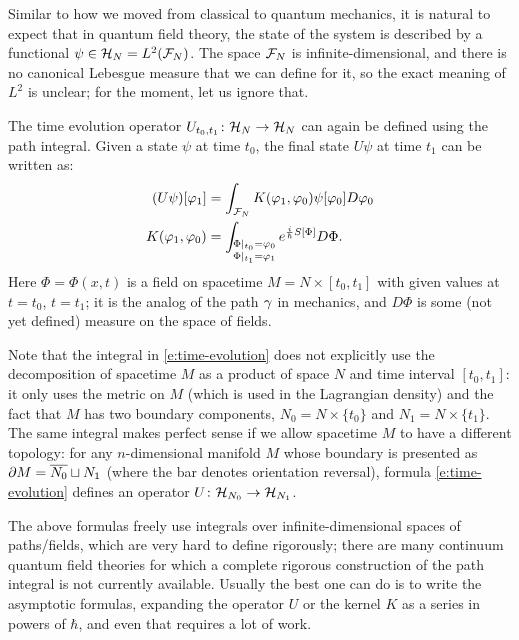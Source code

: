
Similar to how we moved from classical to quantum mechanics, it is natural to
expect that in quantum field theory, the state of the system is described by a
functional $\psi \in \mathcal{H}_N = L^2(\mathcal{F}_N)$. The space $\mathcal{F}_N$ is
infinite-dimensional, and there is no canonical Lebesgue measure that we can
define for it, so the exact meaning of $L^2$ is unclear; for the
moment, let us ignore that.


The time evolution operator $U_{t_0,t_1}\colon \mathcal{H}_N \rightarrow \mathcal{H}_N$
can again be defined using the path integral.
Given a state $\psi$ at time $t_0$, the final state $U\psi$ at time $t_1$
can be written as:
\begin{equation}\label{e:time-evolution}
  \begin{aligned}
	(U \psi)[\varphi_1] &= \int_{\mathcal{F}_N} K(\varphi_1,\varphi_0) \psi[\varphi_0] D \varphi_0\\
	K(\varphi_1,\varphi_0) &= \int_{\substack{\Phi|_{t_0}
  =\varphi_0 \\ \Phi|_{t_1}=\varphi_1}} e^{\frac{i}{\hbar} S[\Phi]} D\Phi.
  \end{aligned}
\end{equation}
Here $\Phi=\Phi(x,t)$ is a field on spacetime $M=N\times[t_0,t_1]$ with given
values at $t=t_0$, $t=t_1$; it is the analog of the path $\gamma$ in mechanics, and
$D\Phi$ is some (not yet defined) measure on the space of fields.


Note that the integral in \eqref{e:time-evolution} does not explicitly use the
decomposition of spacetime $M$ as a product of space $N$ and time interval
$[t_0, t_1]$: it only uses the metric on $M$ (which is used in the Lagrangian
density) and the fact that $M$ has two boundary components, $N_0=N\times\{t_0\}$
and $N_1 = N\times \{t_1\}$. The same integral makes perfect sense if we allow
spacetime $M$ to have a different topology: for any $n$-dimensional manifold $M$
whose boundary is presented as $\partial M=\overline{N_0}\sqcup N_1$ (where the bar
denotes orientation reversal), formula \eqref{e:time-evolution} defines an
operator $U\colon \mathcal{H}_{N_0}\to \mathcal{H}_{N_1}$.



The above formulas freely use integrals over infinite-dimensional spaces of
paths/fields, which are very hard to define rigorously; there are many
continuum quantum field theories for which a complete rigorous construction of
the path integral is not currently available. Usually the best one can do is to
write the asymptotic formulas, expanding the operator $U$ or the kernel $K$ as
a series in powers of $\hbar$, and even that requires a lot of work.

